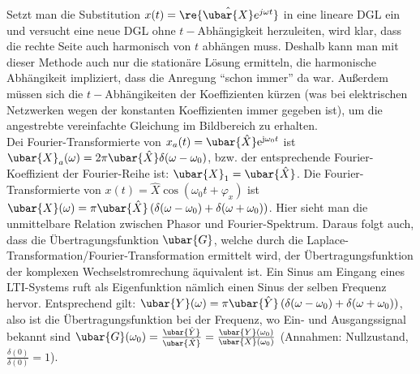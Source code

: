 	 Setzt man die Substitution $x(t)= \re{\hat{\ubar{X}} e^{j \omega t}}$ in eine lineare DGL ein und versucht eine neue DGL ohne $t-$Abhängigkeit herzuleiten, wird klar, dass die rechte Seite auch harmonisch von $t$ abhängen muss. Deshalb kann man mit dieser Methode auch nur die stationäre Lösung ermitteln, die harmonische Abhängikeit impliziert, dass die Anregung \enquote{schon immer} da war. Außerdem müssen sich die $t-$Abhängikeiten der Koeffizienten kürzen (was bei elektrischen Netzwerken wegen der konstanten Koeffizienten immer gegeben ist), um die angestrebte vereinfachte Gleichung im Bildbereich zu erhalten.  \\
	 Dei Fourier-Transformierte von $x_a(t)=\ubar{\hat{X}}\mathrm{e}^{\mathrm{j}\omega_0 t}$ ist $\ubar{X}_a(\omega)=2\pi\ubar{\hat{X}}\delta (\omega - \omega_0)$, bzw. der entsprechende Fourier-Koeffizient der Fourier-Reihe ist: $\ubar{X}_1=\ubar{\hat{X}}$. Die Fourier-Transformierte von $x(t)=\hat{X}\cos (\omega_0 t+\varphi_x)$ ist $\ubar{X}(\omega)=\pi\ubar{\hat{X}}\left(\delta (\omega - \omega_0)+\delta (\omega + \omega_0)\right)$. Hier sieht man die unmittelbare Relation zwischen Phasor und Fourier-Spektrum. Daraus folgt auch, dass die Übertragungsfunktion $\ubar{G}$, welche durch die Laplace-Transformation/Fourier-Transformation ermittelt wird, der Übertragungsfunktion der komplexen Wechselstromrechung äquivalent ist. Ein Sinus am Eingang eines LTI-Systems ruft als Eigenfunktion nämlich einen Sinus der selben Frequenz hervor. Entsprechend gilt: $\ubar{Y}(\omega)=\pi\ubar{\hat{Y}}\left(\delta (\omega - \omega_0)+\delta (\omega + \omega_0)\right)$, also ist die Übertragungsfunktion bei der Frequenz, wo Ein- und Ausgangssignal bekannt sind $\ubar{G}(\omega_0)=\frac{\ubar{\hat{Y}}}{\ubar{\hat{X}}}=\frac{\ubar{{Y}}(\omega_0)}{\ubar{{X}}(\omega_0)}$ (Annahmen: Nullzustand, $\frac{\delta(0)}{\delta(0)}=1$). 
